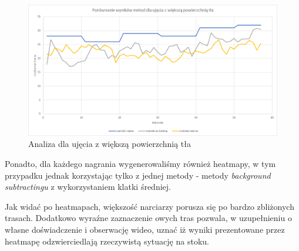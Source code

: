 \documentclass[a4paper]{article}
\begin{document}
\begin{figure}[H]
  \includegraphics[width=\linewidth]{resources/img10.png}
  \caption{Analiza dla ujęcia z większą powierzchnią tła}
\end{figure}

Ponadto, dla każdego nagrania wygenerowaliśmy również heatmapy, w tym przypadku jednak korzystając tylko z jednej metody - metody \textit{background subtractingu} z wykorzystaniem klatki średniej.

Jak widać po heatmapach, większość narciarzy porusza się po bardzo zbliżonych trasach. Dodatkowo wyraźne zaznaczenie owych tras pozwala, w uzupełnieniu o własne doświadczenie i obserwację wideo, uznać iż wyniki prezentowane przez heatmapę odzwierciedlają rzeczywistą sytuację na stoku.
\end{document}
